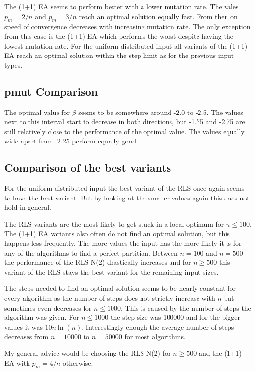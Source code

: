 

The (1+1) EA seems to perform better with a lower mutation rate.
The vales $p_m=2/n$ and $p_m=3/n$ reach an optimal solution equally fast.
From then on speed of convergence decreases with increasing mutation rate.
The only exception from this case is the (1+1) EA which performs the worst despite having the lowest mutation rate.
For the uniform distributed input all variants of the (1+1) EA reach an optimal solution within the step limit as for the previous input types.
\subsection{pmut Comparison}




The optimal value for $\beta$ seems to be somewhere around -2.0 to -2.5.
The values next to this interval start to decrease in both directions, but -1.75 and -2.75 are still relatively close to the performance of the optimal value.
The values equally wide apart from -2.25 perform equally good.

\subsection{Comparison of the best variants}




For the uniform distributed input the best variant of the RLS once again seems to have the best variant.
But by looking at the smaller values again this does not hold in general.



The RLS variants are the most likely to get stuck in a local optimum for $n\le100$. The (1+1) EA variants also often do not find an optimal solution, but this happens less frequently. The more values the input has the more likely it is for any of the algorithms to find a perfect partition. Between $n=100$ and $n=500$ the performance of the RLS-N(2) drastically increases and for $n\ge500$ this variant of the RLS stays the best variant for the remaining input sizes.



The steps needed to find an optimal solution seems to be nearly constant for every algorithm as the number of steps does not strictly increase with $n$ but sometimes even decreases for $n\le1000$.
This is caused by the number of steps the algorithm was given.
For $n\le1000$ the step size was 100000 and for the bigger values it was $10n\ln(n)$.
Interestingly enough the average number of steps decreases from $n=10000$ to $n=50000$ for most algorithms.



My general advice would be choosing the RLS-N(2) for $n\ge500$ and the (1+1) EA with $p_m=4/n$ otherwise.

